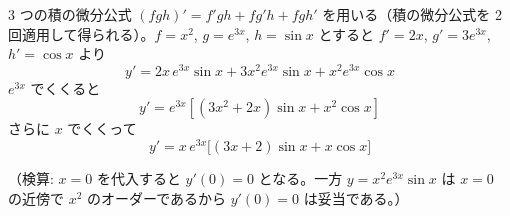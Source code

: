 
3 つの積の微分公式 $(fgh)' = f'gh + fg'h + fgh'$ を用いる（積の微分公式を 2 回適用して得られる）。$f=x^{2}$, $g=e^{3x}$, $h=\sin x$ とすると $f'=2x$, $g'=3e^{3x}$, $h'=\cos x$ より
\[
y' = 2x\,e^{3x}\sin x + 3x^{2}e^{3x}\sin x + x^{2}e^{3x}\cos x
\]
$e^{3x}$ でくくると
\[
y' = e^{3x}\left[(3x^{2}+2x)\sin x + x^{2}\cos x\right]
\]
さらに $x$ でくくって
\[
\boxed{\; y' = x\,e^{3x}\bigl[(3x+2)\sin x + x\cos x\bigr] \;}
\]

（検算: $x=0$ を代入すると $y'(0) = 0$ となる。一方 $y = x^{2}e^{3x}\sin x$ は $x=0$ の近傍で $x^{2}$ のオーダーであるから $y'(0)=0$ は妥当である。）

